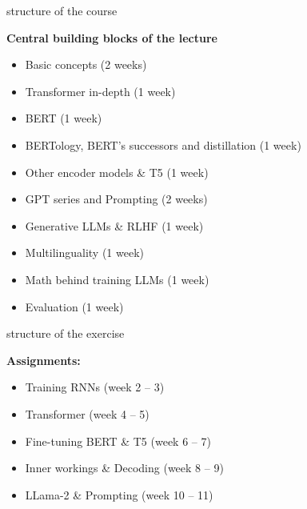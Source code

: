 \begin{vbframe}{structure of the course}

\vfill

\textbf{Central building blocks of the lecture}

	\begin{itemize}
		\item Basic concepts (2 weeks)
		\item Transformer in-depth (1 week)
		\item BERT (1 week)
		\item BERTology, BERT's successors and distillation (1 week)
		\item Other encoder models \& T5 (1 week)
		\item GPT series and Prompting (2 weeks)
		\item Generative LLMs \& RLHF (1 week)
		\item Multilinguality (1 week)
		\item Math behind training LLMs (1 week)
		\item Evaluation (1 week)
	\end{itemize}

\vfill

\end{vbframe}


\begin{vbframe}{structure of the exercise}

\vfill

\textbf{Assignments:}

	\begin{itemize}
		\item Training RNNs (week 2 -- 3)
		\item Transformer (week 4 -- 5)
		\item Fine-tuning BERT \& T5 (week 6 -- 7)
		\item Inner workings \& Decoding (week 8 -- 9)
		\item LLama-2 \& Prompting (week 10 -- 11)
	\end{itemize}

\vfill

\end{vbframe}



